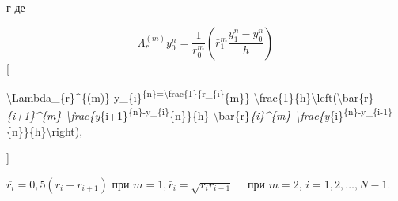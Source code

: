 \documentclass[10pt]{article}
\begin{document}
г де



\[

\Lambda_{r}^{(m)} y_{0}^{n}=\frac{1}{r_{0}^{m}}\left(\bar{r}_{1}^{m} \frac{y_{1}^{n}-y_{0}^{n}}{h}\right)

\][



\textbackslash Lambda\_\{r\}\^{}\{(m)\} y\_\{i\}\textsuperscript{\{n\}=\textbackslash frac\{1\}\{r\_\{i\}}\{m\}\} \textbackslash frac\{1\}\{h\}\textbackslash left(\textbackslash bar\{r\}\textit{\{i+1\}\^{}\{m\} \textbackslash frac\{y}\{i+1\}\textsuperscript{\{n\}-y\_\{i\}}\{n\}\}\{h\}-\textbackslash bar\{r\}\textit{\{i\}\^{}\{m\} \textbackslash frac\{y}\{i\}\textsuperscript{\{n\}-y\_\{i-1\}}\{n\}\}\{h\}\textbackslash right),

]



$\overline{r_{i}}=0,5\left(r_{i}+r_{i+1}\right)$ при $m=1, \bar{r}_{i}=\sqrt{r_{i} r_{i-1}} \quad$ при $m=2$, $i=1,2, \ldots, N-1$.
\end{document}

